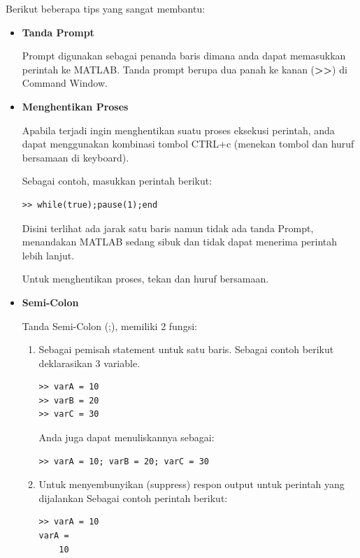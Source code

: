 \documentclass[12pt]{book}
\begin{document}
	Berikut beberapa tips yang sangat membantu:
	
	\begin{itemize}
		\item \textbf{Tanda Prompt}
		
		Prompt digunakan sebagai penanda baris dimana anda dapat memasukkan perintah ke MATLAB.
		Tanda prompt berupa dua panah ke kanan (\textbf{>>}) di Command Window.
		
		\item \textbf{Menghentikan Proses}
		
		Apabila terjadi ingin menghentikan suatu proses eksekusi perintah,
		anda dapat menggunakan kombinasi tombol CTRL+c (menekan tombol  dan huruf  bersamaan di keyboard).
	
		Sebagai contoh, masukkan perintah berikut:
		\begin{verbatim}
>> while(true);pause(1);end
		\end{verbatim}
		
		Disini terlihat ada jarak satu baris namun tidak ada tanda Prompt,
		menandakan MATLAB sedang sibuk dan tidak dapat menerima perintah lebih lanjut.
		
		Untuk menghentikan proses, tekan  dan huruf  bersamaan.
		
		\item \textbf{Semi-Colon}
		
		Tanda Semi-Colon (;), memiliki 2 fungsi:
		\begin{enumerate}
			\item Sebagai pemisah statement untuk satu baris.
			Sebagai contoh berikut deklarasikan 3 variable.
			\begin{verbatim}
>> varA = 10
>> varB = 20
>> varC = 30
			\end{verbatim}
		
			Anda juga dapat menuliskannya sebagai:
			\begin{verbatim}
>> varA = 10; varB = 20; varC = 30
			\end{verbatim}
		
			\item Untuk menyembunyikan (suppress) respon output untuk perintah yang dijalankan
			Sebagai contoh perintah berikut:
			\begin{verbatim}
>> varA = 10
varA =
	10
			\end{verbatim}
		

\end{enumerate}
\end{itemize}
\end{document}
